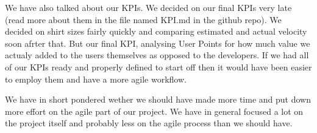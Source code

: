 \documentclass{scrartcl}
\begin{document}
We have also talked about our KPIs. We decided on our final KPIs very late (read more about them in the file named KPI.md in the github repo). We decided on shirt sizes fairly quickly and comparing estimated and actual velocity soon afrter that. But our final KPI, analysing User Points for how much value we actualy added to the users themselves as opposed to the developers. If we had all of our KPIs ready and properly defined to start off then it would have been easier to employ them and have a more agile workflow. 

We have in short pondered wether we should have made more time and put down more effort on the agile part of our project. We have in general focused a lot on the project itself and probably less on the agile process than we should have. 
\end{document}
